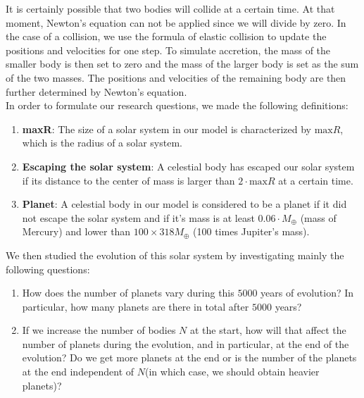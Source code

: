 It is certainly possible that two bodies will collide at a certain time. 
At that moment, Newton's equation can not be applied since we will divide by zero. 
In the case of a collision, we use the formula of elastic collision to update the positions and velocities for one step. 
To simulate accretion, the mass of the smaller body is then set to zero and the mass of the larger body is set as the sum of the two masses. 
The positions and velocities of the remaining body are then further determined by Newton's equation.\\

In order to formulate our research questions, we made the following definitions:\\
\begin{enumerate}
\item \textbf{maxR}: The size of a solar system in our model is characterized by $\text{max}R$, which is the radius of a solar system. 
\item \textbf{Escaping the solar system}: A celestial body has escaped our solar system if its distance to the center of mass is larger than $2\cdot\text{max}R$ at a certain time.
\item \textbf{Planet}: A celestial body in our model is considered to be a planet if it did not escape the solar system and if it's mass is at least $0.06\cdot M_{\oplus}$ (mass of Mercury) and lower than $100\times 318M_{\oplus}$ (100 times Jupiter's mass).
\end{enumerate}
We then studied the evolution of this solar system by investigating mainly the following questions:
\begin{enumerate}
	\item  How does the number of planets vary during this $5000$ years of evolution? In particular, how many planets are there in total after $5000$ years?
	
	\item  If we increase the number of bodies $N$ at the start, how will that affect the number of planets during the evolution, and in particular, at the end of the evolution? Do we get more planets at the end or is the number of the planets at the end independent of $N$(in which case, we should obtain heavier planets)?   


\end{enumerate}
 
